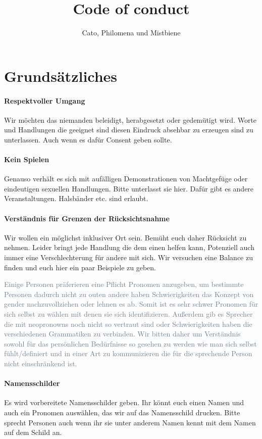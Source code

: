 \documentclass{article}
\title{Code of conduct}
\author{Cato, Philomena und Mistbiene}
\begin{document}
\section{Grundsätzliches}
\paragraph{\textcolor{PastelRed}{Respektvoller Umgang}}
Wir möchten das niemanden beleidigt, herabgesetzt oder gedemütigt wird. Worte und Handlungen die geeignet sind diesen Eindruck absehbar zu erzeugen sind zu unterlassen. Auch wenn es dafür Consent geben sollte. 
\paragraph{\textcolor{PastelRed}{Kein Spielen}}
Genauso verhält es sich mit aufälligen Demonstrationen von Machtgefüge oder eindeutigen sexuellen Handlungen. Bitte unterlasst sie hier. Dafür gibt es andere Veranstaltungen. Halsbänder etc. sind erlaubt.
\paragraph{\textcolor{PastelRed}{Verständnis für Grenzen der Rücksichtsnahme}}
Wir wollen ein möglichst inklusiver Ort sein. Bemüht euch daher Rücksicht zu nehmen. Leider bringt jede Handlung die dem einen helfen kann, Potenziell auch immer eine Verschlechterung für andere mit sich. Wir versuchen eine Balance zu finden und euch hier ein paar Beispiele zu geben.

\begingroup{}
\textcolor{SlateGrey}{Einige Personen präferieren eine Pflicht Pronomen anzugeben, um bestimmte Personen dadurch nicht zu outen andere haben Schwierigkeiten das Konzept von gender nachzuvollziehen oder lehnen es ab. Somit ist es sehr schwer Pronomen für sich selbst zu wählen mit denen sie sich identifizieren. Außerdem gib es Sprecher die mit neopronowns noch nicht so vertraut sind oder Schwierigkeiten haben die verschiedenen Grammatiken zu verbinden. Wir bitten daher um Verständnis sowohl für das persönlichen Bedürfnisse so gesehen zu werden wie man sich selbst fühlt/definiert und in einer Art zu kommunizieren die für die sprechende Person nicht einschränkend ist.}

\endgroup
\paragraph{\textcolor{PastelRed}{Namensschilder}}
Es wird vorbereitete Namensschilder geben. Ihr könnt euch einen Namen und auch ein Pronomen auswählen, das wir auf das Namensschild drucken. Bitte sprecht Personen auch wenn ihr sie unter anderem Namen kennt mit dem Namen auf dem Schild an.
\end{document}
